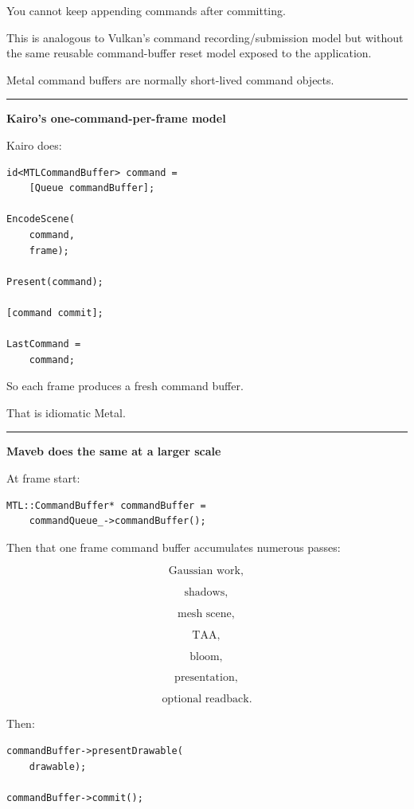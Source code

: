 You cannot keep appending commands after committing.

This is analogous to Vulkan's command recording/submission model but without the same reusable command-buffer reset model exposed to the application.

Metal command buffers are normally short-lived command objects.

\begin{center}\rule{0.5\linewidth}{0.5pt}\end{center}

\textbf{Kairo's one-command-per-frame model}

Kairo does:

\begin{verbatim}
id<MTLCommandBuffer> command =
    [Queue commandBuffer];

EncodeScene(
    command,
    frame);

Present(command);

[command commit];

LastCommand =
    command;
\end{verbatim}

So each frame produces a fresh command buffer.

That is idiomatic Metal.

\begin{center}\rule{0.5\linewidth}{0.5pt}\end{center}

\textbf{Maveb does the same at a larger scale}

At frame start:

\begin{verbatim}
MTL::CommandBuffer* commandBuffer =
    commandQueue_->commandBuffer();
\end{verbatim}

Then that one frame command buffer accumulates numerous passes:

\[
\text{Gaussian work},
\]

\[
\text{shadows},
\]

\[
\text{mesh scene},
\]

\[
\text{TAA},
\]

\[
\text{bloom},
\]

\[
\text{presentation},
\]

\[
\text{optional readback}.
\]

Then:

\begin{verbatim}
commandBuffer->presentDrawable(
    drawable);

commandBuffer->commit();
\end{verbatim}

